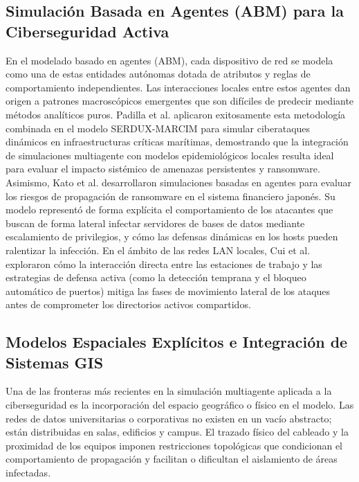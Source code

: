\subsection{Simulación Basada en Agentes (ABM) para la Ciberseguridad Activa}
En el modelado basado en agentes (ABM), cada dispositivo de red se modela como una de estas entidades autónomas dotada de atributos y reglas de comportamiento independientes. Las interacciones locales entre estos agentes dan origen a patrones macroscópicos emergentes que son difíciles de predecir mediante métodos analíticos puros.
Padilla et al. \cite{padilla2025serdux} aplicaron exitosamente esta metodología combinada en el modelo SERDUX-MARCIM para simular ciberataques dinámicos en infraestructuras críticas marítimas, demostrando que la integración de simulaciones multiagente con modelos epidemiológicos locales resulta ideal para evaluar el impacto sistémico de amenazas persistentes y ransomware.
Asimismo, Kato et al. \cite{kato2025agent} desarrollaron simulaciones basadas en agentes para evaluar los riesgos de propagación de ransomware en el sistema financiero japonés. Su modelo representó de forma explícita el comportamiento de los atacantes que buscan de forma lateral infectar servidores de bases de datos mediante escalamiento de privilegios, y cómo las defensas dinámicas en los hosts pueden ralentizar la infección. En el ámbito de las redes LAN locales, Cui et al. \cite{cui2021agent} exploraron cómo la interacción directa entre las estaciones de trabajo y las estrategias de defensa activa (como la detección temprana y el bloqueo automático de puertos) mitiga las fases de movimiento lateral de los ataques antes de comprometer los directorios activos compartidos.

\subsection{Modelos Espaciales Explícitos e Integración de Sistemas GIS}
Una de las fronteras más recientes en la simulación multiagente aplicada a la ciberseguridad es la incorporación del espacio geográfico o físico en el modelo. Las redes de datos universitarias o corporativas no existen en un vacío abstracto; están distribuidas en salas, edificios y campus. El trazado físico del cableado y la proximidad de los equipos imponen restricciones topológicas que condicionan el comportamiento de propagación y facilitan o dificultan el aislamiento de áreas infectadas.

